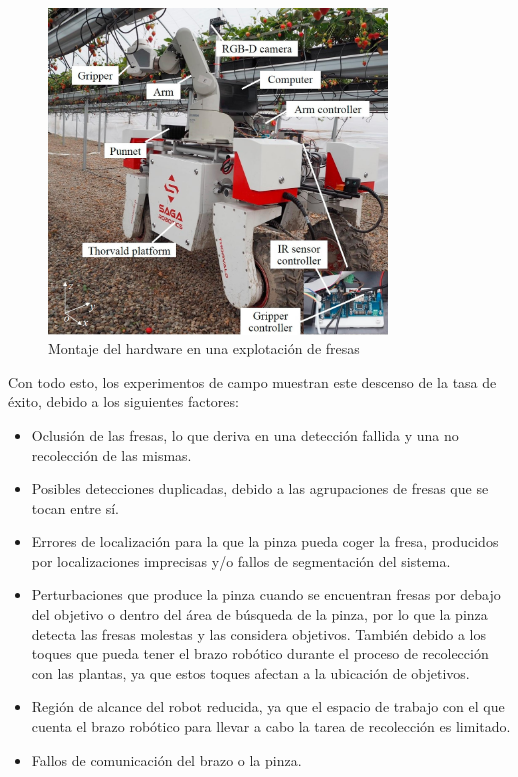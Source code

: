 \begin{figure} [H]
    \begin{center}
      \includegraphics[width=9cm]{figs/Hardware assembly in a strawberry farm.jpg}
    \end{center}
    \caption{Montaje del hardware en una explotación de fresas}
    \label{fig:Robot_Xiong}
\end{figure}

Con todo esto, los experimentos de campo muestran %
este descenso de la tasa de éxito, debido a los siguientes factores:

\begin{itemize}
    \item Oclusión de las fresas, lo que deriva en una detección fallida y una no recolección de las mismas.
    \item Posibles detecciones duplicadas, debido a las agrupaciones de fresas que se tocan entre sí.
    \item Errores de localización %
    para la que la pinza pueda coger la fresa, producidos por localizaciones imprecisas y/o fallos de segmentación del sistema.%
    \item Perturbaciones que produce la pinza cuando se encuentran fresas por debajo del objetivo o dentro del área de búsqueda de la pinza, por lo que la pinza detecta las fresas molestas y las considera objetivos. También debido a los toques que pueda tener el brazo robótico durante el proceso de recolección con las plantas, ya que estos toques afectan a la ubicación de objetivos.
    \item Región de alcance del robot reducida, ya que el espacio de trabajo con el que cuenta el brazo robótico para llevar a cabo la tarea de recolección es limitado.
    \item Fallos de comunicación del brazo o la pinza.
\end{itemize}

